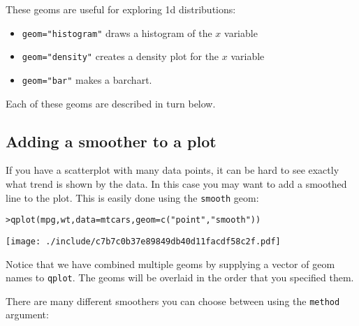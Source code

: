 These geoms are useful for exploring 1d distributions:

\begin{itemize}
	\item {\tt geom="histogram"} draws a histogram of the $x$ variable
	\item {\tt geom="density"} creates a density plot for the $x$ variable
	\item {\tt geom="bar"} makes a barchart.
\end{itemize}

Each of these geoms are described in turn below.

\subsection{Adding a smoother to a plot}\label{sub:smooth}

If you have a scatterplot with many data points, it can be hard to see exactly what trend is shown by the data.  In this case you may want to add a smoothed line to the plot.  This is easily done using the {\tt smooth} geom:

\begin{alltt}
> qplot(mpg, wt, data = mtcars, geom = c("point", "smooth"))
\end{alltt}
\texttt{[image: ./include/c7b7c0b37e89849db40d11facdf58c2f.pdf]}
\begin{alltt}

\end{alltt}

Notice that we have combined multiple geoms by supplying a vector of geom names to {\tt qplot}.  The geoms will be overlaid in the order that you specified them.

There are many different smoothers you can choose between using the {\tt method} argument:

